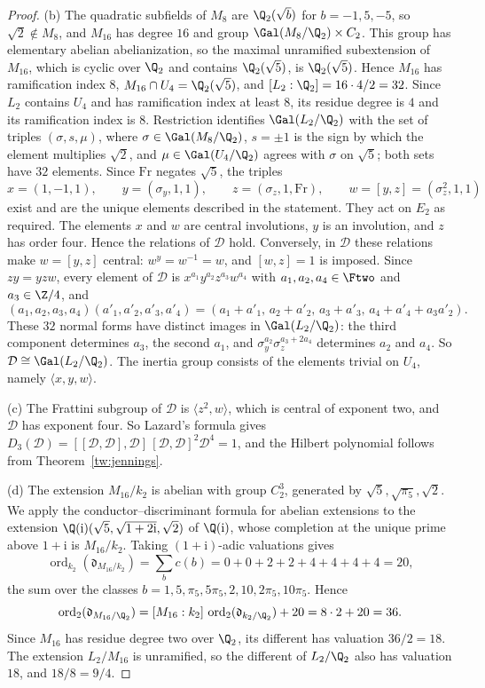 \begin{proof}
(b) The quadratic subfields of $M_8$ are $\Q_2(\sqrt b)$ for $b=-1,5,-5$, so
$\sqrt2\notin M_8$, and $M_{16}$ has degree $16$ and group
$\Gal(M_8/\Q_2)\times C_2$. This group has elementary abelian
abelianization, so the maximal unramified subextension of $M_{16}$, which is
cyclic over $\Q_2$ and contains $\Q_2(\sqrt5)$, is $\Q_2(\sqrt5)$. Hence
$M_{16}$ has ramification index $8$, $M_{16}\cap U_4=\Q_2(\sqrt5)$, and
$[L_2:\Q_2]=16\cdot4/2=32$. Since $L_2$ contains $U_4$ and has ramification
index at least $8$, its residue degree is $4$ and its ramification index is
$8$. Restriction identifies $\Gal(L_2/\Q_2)$ with the set of triples
$(\sigma,s,\mu)$, where $\sigma\in\Gal(M_8/\Q_2)$, $s=\pm1$ is
the sign by which the element multiplies $\sqrt2$, and $\mu\in\Gal(U_4/\Q_2)$
agrees with $\sigma$ on $\sqrt5$; both sets have $32$ elements. Since $\mathrm{Fr}$
negates $\sqrt5$, the triples
\[
 x=(1,-1,1),\qquad y=(\sigma_y,1,1),\qquad z=(\sigma_z,1,\mathrm{Fr}),\qquad
 w=[y,z]=(\sigma_z^2,1,1)
\]
exist and are the unique elements described in the statement. They act on
$E_2$ as required. The elements $x$ and $w$ are central involutions, $y$ is
an involution, and $z$ has order four. Hence the relations of $\mathcal D$ hold. Conversely, in
$\mathcal D$ these relations make $w=[y,z]$ central: $w^y=w^{-1}=w$, and $[w,z]=1$ is
imposed. Since $zy=yzw$, every element of $\mathcal D$ is
$x^{a_1}y^{a_2}z^{a_3}w^{a_4}$ with $a_1,a_2,a_4\in\Ftwo$ and
$a_3\in\Z/4$, and
\[
 (a_1,a_2,a_3,a_4)(a'_1,a'_2,a'_3,a'_4)
 =(a_1+a'_1,\,a_2+a'_2,\,a_3+a'_3,\,a_4+a'_4+a_3a'_2).
\]
These $32$ normal forms have distinct images in $\Gal(L_2/\Q_2)$: the third
component determines $a_3$, the second $a_1$, and
$\sigma_y^{a_2}\sigma_z^{a_3+2a_4}$ determines $a_2$ and $a_4$. So
$\mathcal D\cong\Gal(L_2/\Q_2)$. The inertia group consists of the elements trivial
on $U_4$, namely $\langle x,y,w\rangle$.

(c) The Frattini subgroup of $\mathcal D$ is $\langle z^2,w\rangle$, which is central
of exponent two, and $\mathcal D$ has exponent four. So Lazard's formula gives
$D_3(\mathcal D)=[[\mathcal D,\mathcal D],\mathcal D]\,[\mathcal D,\mathcal D]^2\mathcal D^4=1$, and the Hilbert polynomial follows from
Theorem~\ref{tw:jennings}.

(d) The extension $M_{16}/k_2$ is abelian with group $C_2^3$, generated by
$\sqrt5,\sqrt{\pi_5},\sqrt2$. We apply the conductor--discriminant formula for
abelian extensions \cite[Chapter~V, Theorem~3.27]{MilneCFT} to the extension
$\Q(\mathrm i)(\sqrt5,\sqrt{1+2\mathrm i},\sqrt2)$ of $\Q(\mathrm i)$, whose completion at the unique
prime above $1+\mathrm i$ is $M_{16}/k_2$. Taking $(1+\mathrm i)$-adic valuations gives
\[
 \operatorname{ord}_{k_2}(\mathfrak d_{M_{16}/k_2})=\sum_bc(b)=0+0+2+2+4+4+4+4=20,
\]
the sum over the classes $b=1,5,\pi_5,5\pi_5,2,10,2\pi_5,10\pi_5$. Hence
\[
 \operatorname{ord}_2(\mathfrak d_{M_{16}/\Q_2})
 =[M_{16}:k_2]\,\operatorname{ord}_2(\mathfrak d_{k_2/\Q_2})+20=8\cdot2+20=36.
\]
Since $M_{16}$ has residue degree two over $\Q_2$, its different has
valuation $36/2=18$. The extension $L_2/M_{16}$ is unramified, so the
different of $L_2/\Q_2$ also has valuation $18$, and $18/8=9/4$.
\end{proof}

